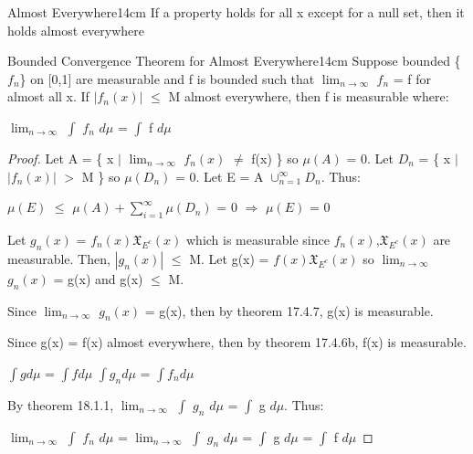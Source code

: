     \vspace{0.5cm}



    \begin{definition}{Almost Everywhere}{14cm}
        If a property holds for all x except for a null set,
        then it holds {\color{lblue} almost everywhere}
    \end{definition}

    \vspace{0.5cm}



    \begin{wtheorem}{Bounded Convergence Theorem for Almost Everywhere}{14cm}
        Suppose bounded \{$f_n$\} on [0,1] are measurable
        and f is bounded such that $\lim_{n \rightarrow \infty}$ $f_n$ = f
        for almost all x.
        If $|f_n(x)|$ $\leq$ M almost everywhere, then f is measurable where:

        \hspace{0.5cm}
        $\lim_{n \rightarrow \infty}$ $\int$ $f_n$ $d\mu$ = $\int$ f $d\mu$
    \end{wtheorem}

    \begin{proof}
        Let A = \{ x $|$ $\lim_{n \rightarrow \infty}$ $f_n(x)$ $\not =$ f(x) \}
        so $\mu(A)$ = 0.
        Let $D_n$ = \{ x $|$ $|f_n(x)|$ $>$ M \} so $\mu(D_n)$ = 0.
        Let E = A $\cup_{n=1}^{\infty} D_n$. Thus:

        \hspace{0.5cm}
        $\mu(E)$ $\leq$ $\mu(A) + \sum_{i=1}^{\infty} \mu(D_n)$ = 0
        \hspace{1cm}
        $\Rightarrow$
        \hspace{1cm}
        $\mu(E)$ = 0

        Let $g_n(x)$ = $f_n(x) \mathfrak{X}_{E^c}(x)$
        which is measurable since $f_n(x)$,$\mathfrak{X}_{E^c}(x)$
        are measurable. Then, $|g_n(x)|$ $\leq$ M.
        Let g(x) = $f(x) \mathfrak{X}_{E^c}(x)$
        so $\lim_{n \rightarrow \infty}$ $g_n(x)$ = g(x)
        and g(x) $\leq$ M.

        Since $\lim_{n \rightarrow \infty}$ $g_n(x)$ = g(x),
        then by {\color{red} theorem 17.4.7},  g(x) is measurable.

        Since g(x) = f(x) almost everywhere, then
        by {\color{red} theorem 17.4.6b}, f(x) is measurable.

        \hspace{0.5cm}
        $\int g d\mu$ = $\int f d\mu$
        \hspace{1cm}
        $\int g_n d\mu$ = $\int f_n d\mu$

        By {\color{red} theorem 18.1.1},
        $\lim_{n \rightarrow \infty}$ $\int$ $g_n$ $d\mu$ = $\int$ g $d\mu$.
        Thus:

        \hspace{0.5cm}
        $\lim_{n \rightarrow \infty}$ $\int$ $f_n$ $d\mu$
        = $\lim_{n \rightarrow \infty}$ $\int$ $g_n$ $d\mu$
        = $\int$ g $d\mu$
        = $\int$ f $d\mu$
    \end{proof}


